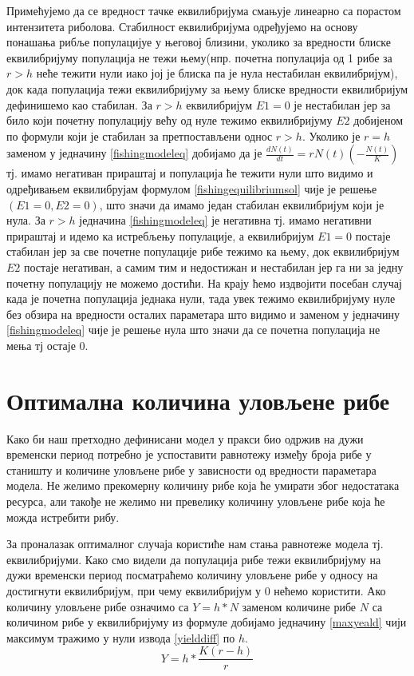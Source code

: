 \documentclass[a4paper]{article}
\begin{document}
{Примећујемо да се вредност тачке еквилибријума смањује линеарно са порастом интензитета риболова. Стабилност еквилибријума одређујемо на основу понашања рибље популацијуе у његовој близини, уколико за вредности блиске еквилибријуму популација не тежи њему(нпр. почетна популација од 1 рибе за $r>h$ неће тежити нули иако јој је блиска па је нула нестабилан еквилибријум), док када популација тежи еквилибријуму за њему блиске вредности еквилибријум дефинишемо као стабилан. За $r>h$ еквилибријум $E1=0$ је нестабилан јер за било који почетну популацију већу од нуле тежимо еквилибријуму $E2$ добијеном по формули који је стабилан за претпостављени однос $r>h$. Уколико је $r = h$ заменом у једначину \ref{fishingmodeleq} добијамо да је $\frac{dN(t)}{dt} = rN(t)\left(-\frac{N(t)}{K}\right)$ тј. имамо негативан прираштај и популација ће тежити нули што видимо и одређивањем еквилибрујам формулом \ref{fishingequilibriumsol} чије је решење $(E1=0, E2=0)$, што значи да имамо један стабилан еквилибријум који је нула. За $r>h$ једначина \ref{fishingmodeleq} је негативна тј. имамо негативни прираштај и идемо ка истребљењу популације, а еквилибријум $E1=0$ постаје стабилан јер за све почетне популације рибе тежимо ка њему, док еквилибријум $E2$ постаје негативан, а самим тим и недостижан и нестабилан јер га ни за једну почетну популацију не можемо достићи.
На крају ћемо издвојити посебан случај када је почетна популација једнака нули, тада увек тежимо еквилибријуму нуле без обзира на вредности осталих параметара што видимо и заменом у једначину \ref{fishingmodeleq} чије је решење нула што значи да се почетна популација не мења тј остаје 0.

\section{Оптимална количина уловљене рибе}
\label{sec:fishingoptimum}
Како би наш претходно дефинисани модел у пракси био одржив на дужи временски период потребно је успоставити равнотежу између броја рибе у станишту и количине уловљене рибе у зависности од вредности параметара модела. Не желимо прекомерну количину рибе која ће умирати због недостатака ресурса, али такође не желимо ни превелику количину уловљене рибе која ће можда истребити рибу.

За проналазак оптималног случаја користиће нам стања равнотеже модела тј. еквилибријуми. Како смо видели да популација рибе тежи еквилибријуму на дужи временски период посматраћемо количину уловљене рибе у односу на достигнути еквилибријум, при чему еквилибријум у $0$ нећемо користити. 
Ако количину уловљене рибе означимо са $Y = h*N$ заменом количине рибе $N$ са количином рибе у еквилибријуму из формуле добијамо једначину \ref{maxyeald} чији максимум тражимо у нули извода \ref{yielddiff} по $h$.
\begin{equation}
    \label{maxyeald}
    Y = h*\frac{K(r - h) }{r}
\end{equation}

}
\end{document}
